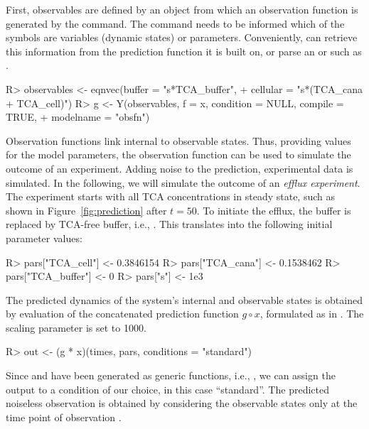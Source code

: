 \documentclass[article]{jss}
\begin{document}
First, observables are defined by an  object from which an observation function  is generated by the  command. The  command needs to be informed which of the symbols are variables (dynamic states) or parameters. Conveniently,  can retrieve this information from the prediction function  it is built on, or parse an  or  such as .
%
\begin{CodeChunk}
\begin{CodeInput}
R> observables <- eqnvec(buffer = "s*TCA_buffer",
+    cellular = "s*(TCA_cana + TCA_cell)")
R> g <- Y(observables, f = x, condition = NULL, compile = TRUE,
+    modelname = "obsfn")
\end{CodeInput}
\end{CodeChunk}
%
Observation functions link internal to observable states. Thus, providing values for the model parameters, the observation function can be used to simulate the outcome of an experiment. Adding noise to the prediction, experimental data is simulated.
In the following, we will simulate the outcome of an \textit{efflux experiment}.
The experiment starts with all TCA concentrations in steady state, such as shown in Figure~\ref{fig:prediction} after $t = 50$. To initiate the efflux, the buffer is replaced by TCA-free buffer, i.e., . This translates into the following initial parameter values:
%
\begin{CodeChunk}
\begin{CodeInput}
R> pars["TCA_cell"] <- 0.3846154
R> pars["TCA_cana"] <- 0.1538462
R> pars["TCA_buffer"] <- 0
R> pars["s"] <- 1e3
\end{CodeInput}
\end{CodeChunk}
%
The predicted dynamics of the system's internal and observable states is obtained by evaluation of the concatenated prediction function $g\circ x$, formulated as  in . The scaling parameter  is set to 1000.
%
\begin{CodeChunk}
\begin{CodeInput}
R> out <- (g * x)(times, pars, conditions = "standard")
\end{CodeInput}
\end{CodeChunk}
%
Since  and  have been generated as generic functions, i.e., , we can assign the output to a condition of our choice, in this case ``standard''.
The predicted noiseless observation is obtained by considering the observable states only at the time point of observation .
\end{document}
